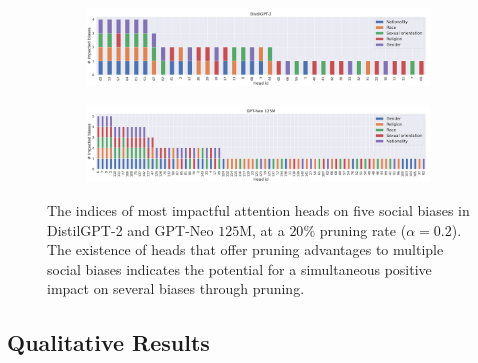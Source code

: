 \documentclass[letterpaper]{article} %
\begin{document}
\begin{figure}[t]
     \centering
    \begin{subfigure}
    \centering    \includegraphics[width=1\textwidth]{figures/head_ids_DistilGPT-2_all_biases_2.pdf}
     \end{subfigure}
   \begin{subfigure}
    \centering    \includegraphics[width=1.0\textwidth]{figures/head_ids_GPT-Neo_125M_all_biases_7.pdf}
     \end{subfigure}
        \caption{The indices of most impactful attention heads on five social biases in DistilGPT-2 and GPT-Neo $125$M, at a $20\%$ pruning rate ($\alpha = 0.2$). The existence of heads that offer pruning advantages to multiple social biases indicates the potential for a simultaneous positive impact on several biases through pruning.}
        \label{fig:head_ids_pruned_more_models_2}
\end{figure}
\subsection{Qualitative Results}
\end{document}
